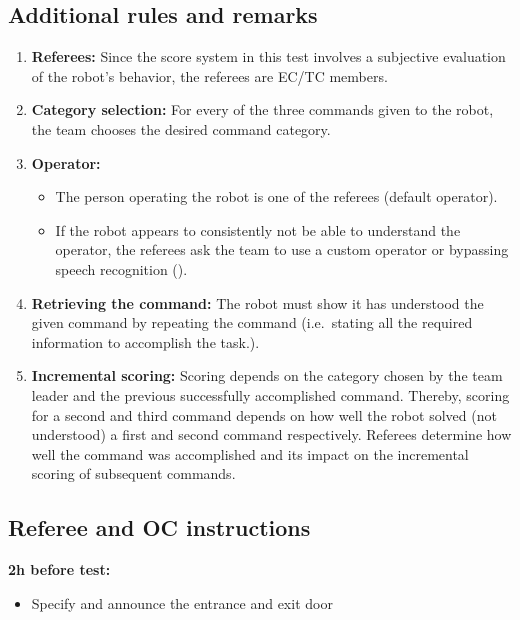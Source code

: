 \subsection{Additional rules and remarks}
\label{sec:gpsr_remarks}
\begin{enumerate}
	\item \textbf{Referees:} Since the score system in this test involves a subjective evaluation of the robot's behavior, the referees are EC/TC members.

	\item \textbf{Category selection:} For every of the three commands given to the robot, the team chooses the desired command category.

	\item \textbf{Operator:}
	\begin{itemize}
		\item The person operating the robot is one of the referees (default operator).
		\item If the robot appears to consistently not be able to understand the operator, the referees ask the team to use a custom operator or bypassing speech recognition ().
	\end{itemize}

	\item \textbf{Retrieving the command:} The robot must show it has understood the given command by repeating the command (i.e.~stating all the required information to accomplish the task.).

	\item \textbf{Incremental scoring:} Scoring depends on the category chosen by the team leader and the previous successfully accomplished command. Thereby, scoring for a second and third command depends on how well the robot solved (not understood) a first and second command respectively. Referees determine how well the command was accomplished and its impact on the incremental scoring of subsequent commands.
\end{enumerate}

\subsection{Referee and OC instructions}
\textbf{2h before test:}
\begin{itemize}
	\item Specify and announce the entrance and exit door
\end{itemize}

